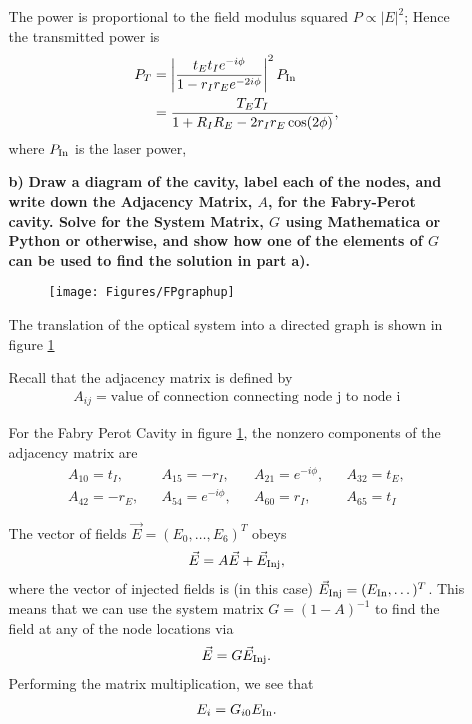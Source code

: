 \documentclass[11pt]{article}
\begin{document}
\begin{enumerate}
\begin{itemize}
The power is proportional to the field modulus squared $P\propto |E|^2$; Hence the transmitted power is
\begin{align}
P_T&=\left |\frac{t_Et_I e^{-i\phi}}{1-r_Ir_E e^{-2i\phi}} \right |^2P_{\rm In} \nonumber \\
&=\frac{T_ET_I}{1+R_IR_E-2r_Ir_E\cos(2\phi)}
,
\end{align}
where $P_{\rm In}$ is the laser power,

\item[\bf b)] {\bf Draw a diagram of the cavity, label each of the nodes, and write down the Adjacency Matrix, $A$, for the Fabry-Perot cavity. Solve for the System Matrix, $G$ using Mathematica or Python or otherwise, and show how one of the elements of $G$ can be used to find the solution in part a).}

\begin{figure}[t]
\texttt{[image: Figures/FPgraphup]}
\caption{
}
\label{fig:FPgraph}
\end{figure}

The translation of the optical system into a directed graph is shown in figure \ref{fig:FPgraph}

Recall that the adjacency matrix is defined by
\begin{align}
A_{ij}=\text{value of connection connecting node j to node i}
\end{align}

For the Fabry Perot Cavity in figure \ref{fig:FPgraph}, the nonzero components of the adjacency matrix are
\begin{align}
&A_{10}=t_I ,& &A_{15}=-r_I,& & A_{21}=e^{-i\phi},& &A_{32}=t_E,& \nonumber \\
&A_{42}=-r_E,&
&A_{54}=e^{-i\phi},&
&A_{60}=r_I,&
&A_{65}=t_I&
\end{align}

The vector of fields $\vec E =(E_0, \dots, E_6)^T$ obeys
\begin{align}
\vec E =A \vec E +\vec E_{\rm Inj},
\end{align}
where  the vector of injected fields is (in this case) $\vec E_{\rm Inj}=(E_{\rm In},\dots)^T$. This means that we can use the system matrix $G=(1-A)^{-1}$ to find the field at any of the node locations via
\begin{align}
\vec E =G \vec E_{\rm Inj} .
\end{align}
Performing the matrix multiplication, we see that
\begin{align}
E_i=G_{i0}E_{\rm In}.
\end{align}


\end{itemize}
\end{enumerate}
\end{document}
